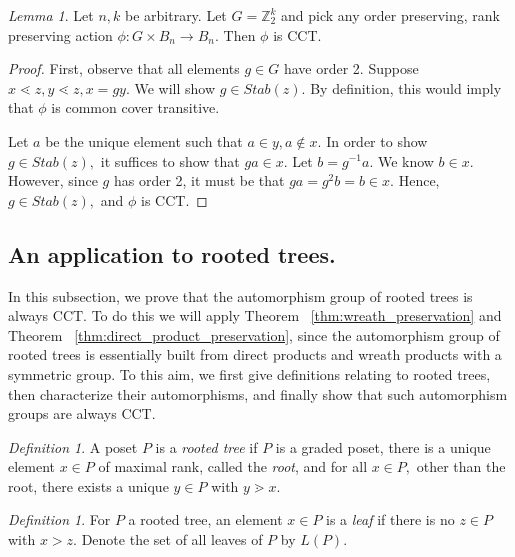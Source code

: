 \documentclass[10 pt]{amsart}
\theoremstyle{plain}
\theoremstyle{definition}
\theoremstyle{remark}
\numberwithin{equation}{section}
\newtheorem{lem}[thm]{Lemma}
\theoremstyle{remark}
\newtheorem{defn}[thm]{Definition}
\newcommand\ssec{\subsection}
\newcommand\BBZ{{\mathbb Z}}
\begin{document}
\begin{lem}
\label{lem:order_2_CCT}
Let $n,k$ be arbitrary. Let $G = \BBZ_2^k$ and pick any order preserving, rank preserving action $\phi:G\times B_n \rightarrow B_n.$ Then $\phi$ is CCT.
\end{lem}
\begin{proof}
First, observe that all elements $g \in G$ have order 2. Suppose $x \lessdot z, y \lessdot z, x = gy.$ We will show $g \in Stab(z).$ By definition, this would imply that $\phi$ is common cover transitive. 

Let $a$ be the unique element such that $a \in y, a \notin x.$ In order to show $g \in Stab(z),$ it suffices to show that $ga \in x.$ Let $b = g^{-1}a.$ We know $b \in x.$ However, since $g$ has order 2, it must be that $ga = g^2 b = b \in x.$ Hence, $g \in Stab(z),$ and $\phi$ is CCT.
\end{proof}

\fi

\ssec{An application to rooted trees.}
\label{ssec:rooted_trees}
In this subsection, we prove that the automorphism group of rooted trees is always CCT. To do this we will apply Theorem ~\ref{thm:wreath_preservation} and Theorem ~\ref{thm:direct_product_preservation}, since the automorphism group of rooted trees is essentially built from direct products and wreath products with a symmetric group. To this aim, we first give definitions relating to rooted trees, then characterize their automorphisms, and finally show that such automorphism groups are always CCT.

\begin{defn}
A poset $P$ is a {\it rooted tree} if $P$ is a graded poset, there is a unique element $x \in P$ of maximal rank, called the {\it root}, and for all $x \in P,$ other than the root, there exists a unique $y \in P$ with $y \gtrdot x.$
\end{defn}

\begin{defn}
For $P$ a rooted tree, an element $x \in P$ is a {\it leaf} if there is no $z \in P$ with $x > z.$ Denote the set of all leaves of $P$ by $L(P).$
\end{defn}
\end{document}
